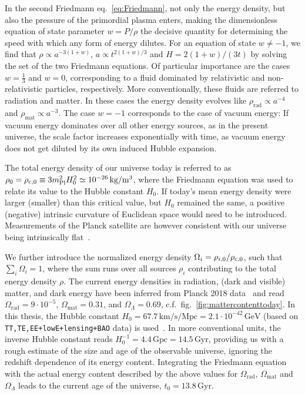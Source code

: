 In the second Friedmann eq.~\eqref{eq:Friedmann}, not only the energy density, but also the pressure of the primordial plasma enters, making the dimensionless equation of state parameter $w = P / \rho$ the decisive quantity for determining the speed with which any form of energy dilutes. For an equation of state $w \neq -1$, we find that $\rho \propto a^{-3(1 + w)}$, $a \propto t^{2(1+w)/3}$ and $H = 2 (1 + w) / (3t)$ by solving the set of the two Friedmann equations. Of particular importance are the cases $w = \frac{1}{3}$ and $w = 0$, corresponding to a  fluid dominated by relativistic and non-relativistic particles, respectively. More conventionally, these fluids are referred to radiation and matter. In these cases the energy density evolves like $\rho_\text{rad} \propto a^{-4}$ and $\rho_\text{mat} \propto a^{-3}$. The case $w = -1$ corresponds to the case of vacuum energy: If vacuum energy dominates over all other energy sources, as in the present universe, the scale factor increases exponentially with time, as vacuum energy does not get diluted by its own induced Hubble expansion.

The total energy density of our universe today is referred to as $\rho_0 = \rho_{\text{c},0} \equiv 3 m_\text{Pl}^2 H^2_0 \simeq 10^{-26} \, \text{kg} / \text{m}^3$, where the Friedmann equation was used to relate its value to the Hubble constant $H_0$. If today's mean energy density were larger (smaller) than this critical value,  but $H_0$ remained the same, a positive (negative) intrinsic curvature of Euclidean space would need to be introduced. Measurements of the Planck satellite are however consistent with our universe being intrinsically flat~\cite{Planck:2018vyg}.

We further introduce the normalized energy density $\Omega_i = \rho_{i,0} / \rho_{\text{c},0}$, such that $\sum_i \Omega_i = 1$, where the sum runs over all sources $\rho_i$ contributing to the total energy density $\rho$. The current energy densities in radiation, (dark and visible) matter, and dark energy have been inferred from Planck 2018 data~\cite{Planck:2018vyg} and read $\Omega_\text{rad} = 9 \cdot 10^{-5}$, $\Omega_\text{mat} = 0.31$, and $\Omega_\Lambda = 0.69$, c.f.~fig.~\ref{fig:mattercontenttoday}. In this thesis, the Hubble constant  $H_0 = 67.7\,\text{km}/\text{s}/\text{Mpc} = 2.1 \cdot 10^{-42} \, \text{GeV}$ (based on \texttt{TT,TE,EE+lowE+lensing+BAO} data) is used~\cite{Planck:2018vyg}. In more conventional units, the inverse Hubble constant reads $H_0^{-1} = 4.4 \, \text{Gpc} = 14.5 \, \text{Gyr}$, providing us with a rough estimate of the size and age of the observable universe, ignoring the redshift dependence of its energy content. Integrating the Friedmann equation with the actual energy content described by the above values for $\Omega_\text{rad}$, $\Omega_\text{mat}$ and $\Omega_\Lambda$ leads to the current age of the universe, $t_0 = 13.8 \, \text{Gyr}$.

